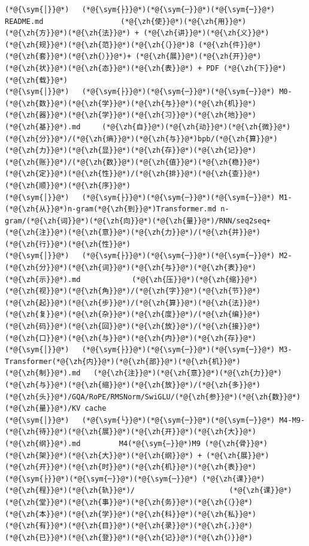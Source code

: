 \documentclass[
]{article}
\def\zh#1{{\zhfont #1}}
\def\sym#1{{\symfont #1}}
\begin{document}
\begin{lstlisting}
(*@{\sym{│}}@*)   (*@{\sym{├}}@*)(*@{\sym{─}}@*)(*@{\sym{─}}@*) README.md                  (*@{\zh{使}}@*)(*@{\zh{用}}@*)(*@{\zh{方}}@*)(*@{\zh{法}}@*) + (*@{\zh{讲}}@*)(*@{\zh{义}}@*)(*@{\zh{规}}@*)(*@{\zh{范}}@*)(*@{\zh{（}}@*)8 (*@{\zh{件}}@*)(*@{\zh{套}}@*)(*@{\zh{）}}@*)+ (*@{\zh{展}}@*)(*@{\zh{开}}@*)(*@{\zh{状}}@*)(*@{\zh{态}}@*)(*@{\zh{表}}@*) + PDF (*@{\zh{下}}@*)(*@{\zh{载}}@*)
(*@{\sym{│}}@*)   (*@{\sym{├}}@*)(*@{\sym{─}}@*)(*@{\sym{─}}@*) M0-(*@{\zh{数}}@*)(*@{\zh{学}}@*)(*@{\zh{与}}@*)(*@{\zh{机}}@*)(*@{\zh{器}}@*)(*@{\zh{学}}@*)(*@{\zh{习}}@*)(*@{\zh{地}}@*)(*@{\zh{基}}@*).md     (*@{\zh{自}}@*)(*@{\zh{动}}@*)(*@{\zh{微}}@*)(*@{\zh{分}}@*)/(*@{\zh{熵}}@*)(*@{\zh{与}}@*)bpb/(*@{\zh{算}}@*)(*@{\zh{力}}@*)(*@{\zh{显}}@*)(*@{\zh{存}}@*)(*@{\zh{记}}@*)(*@{\zh{账}}@*)/(*@{\zh{数}}@*)(*@{\zh{值}}@*)(*@{\zh{稳}}@*)(*@{\zh{定}}@*)(*@{\zh{性}}@*)/(*@{\zh{排}}@*)(*@{\zh{查}}@*)(*@{\zh{顺}}@*)(*@{\zh{序}}@*)
(*@{\sym{│}}@*)   (*@{\sym{├}}@*)(*@{\sym{─}}@*)(*@{\sym{─}}@*) M1-(*@{\zh{从}}@*)n-gram(*@{\zh{到}}@*)Transformer.md n-gram/(*@{\zh{词}}@*)(*@{\zh{向}}@*)(*@{\zh{量}}@*)/RNN/seq2seq+(*@{\zh{注}}@*)(*@{\zh{意}}@*)(*@{\zh{力}}@*)/(*@{\zh{并}}@*)(*@{\zh{行}}@*)(*@{\zh{性}}@*)
(*@{\sym{│}}@*)   (*@{\sym{├}}@*)(*@{\sym{─}}@*)(*@{\sym{─}}@*) M2-(*@{\zh{分}}@*)(*@{\zh{词}}@*)(*@{\zh{与}}@*)(*@{\zh{表}}@*)(*@{\zh{示}}@*).md            (*@{\zh{压}}@*)(*@{\zh{缩}}@*)(*@{\zh{视}}@*)(*@{\zh{角}}@*)/(*@{\zh{字}}@*)(*@{\zh{节}}@*)(*@{\zh{起}}@*)(*@{\zh{步}}@*)/(*@{\zh{算}}@*)(*@{\zh{法}}@*)(*@{\zh{复}}@*)(*@{\zh{杂}}@*)(*@{\zh{度}}@*)/(*@{\zh{编}}@*)(*@{\zh{码}}@*)(*@{\zh{回}}@*)(*@{\zh{放}}@*)/(*@{\zh{接}}@*)(*@{\zh{口}}@*)(*@{\zh{与}}@*)(*@{\zh{内}}@*)(*@{\zh{存}}@*)
(*@{\sym{│}}@*)   (*@{\sym{├}}@*)(*@{\sym{─}}@*)(*@{\sym{─}}@*) M3-Transformer(*@{\zh{内}}@*)(*@{\zh{部}}@*)(*@{\zh{机}}@*)(*@{\zh{制}}@*).md   (*@{\zh{注}}@*)(*@{\zh{意}}@*)(*@{\zh{力}}@*)(*@{\zh{与}}@*)(*@{\zh{缩}}@*)(*@{\zh{放}}@*)/(*@{\zh{多}}@*)(*@{\zh{头}}@*)/GQA/RoPE/RMSNorm/SwiGLU/(*@{\zh{参}}@*)(*@{\zh{数}}@*)(*@{\zh{量}}@*)/KV cache
(*@{\sym{│}}@*)   (*@{\sym{└}}@*)(*@{\sym{─}}@*)(*@{\sym{─}}@*) M4-M9-(*@{\zh{待}}@*)(*@{\zh{展}}@*)(*@{\zh{开}}@*)(*@{\zh{大}}@*)(*@{\zh{纲}}@*).md         M4(*@{\sym{–}}@*)M9 (*@{\zh{骨}}@*)(*@{\zh{架}}@*)(*@{\zh{大}}@*)(*@{\zh{纲}}@*) + (*@{\zh{展}}@*)(*@{\zh{开}}@*)(*@{\zh{时}}@*)(*@{\zh{机}}@*)(*@{\zh{表}}@*)
(*@{\sym{├}}@*)(*@{\sym{─}}@*)(*@{\sym{─}}@*) (*@{\zh{课}}@*)(*@{\zh{程}}@*)(*@{\zh{轨}}@*)/                      (*@{\zh{课}}@*)(*@{\zh{堂}}@*)(*@{\zh{事}}@*)(*@{\zh{务}}@*)(*@{\zh{（}}@*)(*@{\zh{本}}@*)(*@{\zh{学}}@*)(*@{\zh{科}}@*)(*@{\zh{私}}@*)(*@{\zh{有}}@*)(*@{\zh{目}}@*)(*@{\zh{录}}@*)(*@{\zh{，}}@*)(*@{\zh{已}}@*)(*@{\zh{登}}@*)(*@{\zh{记}}@*)(*@{\zh{）}}@*)

\end{lstlisting}
\end{document}
